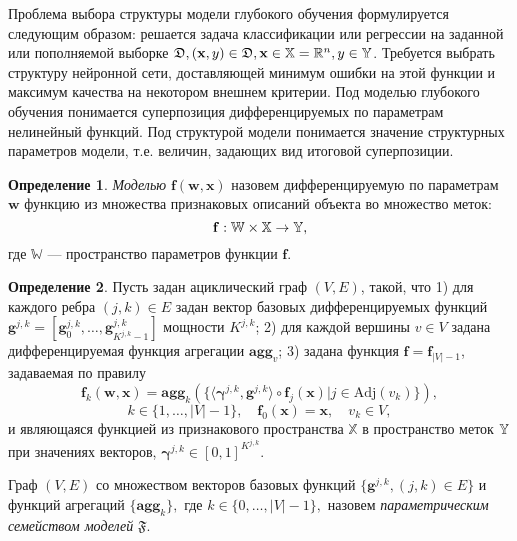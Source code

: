 \documentclass[11pt, a5paper]{dissert}
\theoremstyle{definition}
\newtheorem{defin}{Определение}
\begin{document}
Проблема выбора структуры модели глубокого обучения формулируется следующим образом: решается задача классификации или регрессии на заданной или пополняемой выборке $\mathfrak{D}, (\mathbf{x}, y) \in \mathfrak{D}, \mathbf{x} \in \mathbb{X} =  \mathbb{R}^n, y \in \mathbb{Y}$. Требуется выбрать структуру нейронной сети, доставляющей минимум ошибки на этой функции и максимум качества на некотором внешнем критерии.
 Под моделью глубокого обучения понимается суперпозиция дифференцируемых по параметрам нелинейный функций. Под структурой модели понимается значение структурных параметров модели, т.е. величин, задающих вид итоговой суперпозиции. 



\begin{defin}
\textit{Моделью} $\mathbf{f}(\mathbf{w}, \mathbf{x})$ назовем дифференцируемую по параметрам $\mathbf{w}$ функцию из множества признаковых описаний объекта во множество меток:
\[
    \mathbf{f}:  \mathbb{W}  \times \mathbb{X} \to \mathbb{Y},
\] 
где $\mathbb{W}$ --- пространство параметров функции $\mathbf{f}$.
\end{defin}

\begin{defin}
Пусть задан ациклический граф $(V,E)$, такой, что 
1) для каждого ребра $(j,k) \in E$ задан вектор базовых дифференцируемых функций  $\mathbf{g}^{j,k} = [\mathbf{g}^{j,k}_0, \dots, \mathbf{g}^{j,k}_{K^{j,k}-1}]$  мощности $K^{j,k}$;
2) для каждой вершины $v \in V$ задана дифференцируемая функция агрегации $\textbf{agg}_v$;
3) задана функция $\mathbf{f} = \mathbf{f}_{|V|-1}$, задаваемая по правилу 
\begin{equation}
\label{eq:modelfam}
    \mathbf{f}_{k}(\mathbf{w}, \mathbf{x}) = \textbf{agg}_{k}\left(\{ \langle \boldsymbol{\gamma}^{j,k}, \mathbf{g}^{j,k} \rangle \circ  \mathbf{f}_j(\mathbf{x})| j \in \text{Adj}(v_k)\}\right), 
\end{equation}
\[
k \in \{1,\dots,|V|-1\}, \quad \mathbf{f}_0(\mathbf{x}) = \mathbf{x}, \quad v_k \in V,
\]
и являющаяся функцией из признакового пространства $\mathbb{X}$ в пространство меток $\mathbb{Y}$ при значениях векторов, $\boldsymbol{\gamma}^{j,k} \in [0,1]^{K^{j,k}}$.

Граф $(V, E)$ со множеством векторов базовых функций $\{\mathbf{g}^{j,k}, (j,k) \in E\}$ и функций агрегаций $\{\textbf{agg}_k\},$ где $k \in \{0, \dots, |V|-1\},$ назовем \textit{параметрическим семейством моделей} $\mathfrak{F}$.
\end{defin}
\end{document}
